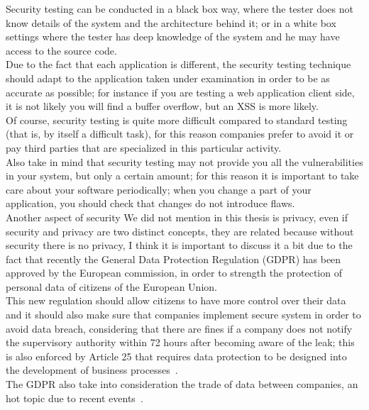 Security testing can be conducted in a black box way, where the tester does not know details of the system and the architecture behind it; or
in a white box settings where the tester has deep knowledge of the system and he may have access to the source code.\\
Due to the fact that each application is different, the security testing technique should adapt to the application taken under examination in order
to be as accurate as possible; for instance if you are testing a web application client side, it is not likely you will find a buffer overflow, but 
an XSS is more likely.\\

Of course, security testing is quite more difficult compared to standard testing (that is, by itself a difficult task), for this reason companies prefer to avoid it or pay third parties that are specialized in this particular activity.\\
Also take in mind that security testing may not provide you all the vulnerabilities in your system, but only a certain amount; for this reason it
is important to take care about your software periodically; when you change a part of your application, you should check that changes do not
introduce flaws.\\

Another aspect of security We did not mention in this thesis is privacy, even if security and privacy are two distinct concepts, they are related because without security there is no privacy, I think it is important to discuss it a bit due to the fact that recently the General Data Protection Regulation (GDPR)
has been approved by the European commission, in order to strength the protection of personal data of citizens of the European Union.\\
This new regulation should allow citizens to have more control over their data and it should also make sure that companies implement secure system
in order to avoid data breach, considering that there are fines if a company does not notify the supervisory authority within 72 hours after becoming aware of the leak; this is also enforced by Article 25 that requires data protection to be designed into the development of business processes~\cite{wikica}.\\
The GDPR also take into consideration the trade of data between companies, an hot topic due to recent events~\cite{ca}.\\


